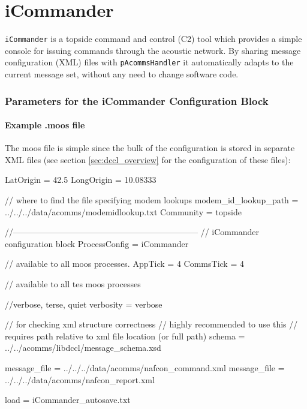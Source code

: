 \documentclass[11pt, letterpaper, oneside]{memoir}
\begin{document}
\section{iCommander}\label{sec:icommander} 

\verb|iCommander| is a topside command and control (C2) tool which provides a simple
console for issuing commands through the acoustic network. By sharing
message configuration (XML) files with \verb|pAcommsHandler| it automatically adapts to the current message set,
without any need to change software code.

\subsubsection{Parameters for the iCommander Configuration Block}
\paragraph{Example .moos file}
The moos file is simple since the bulk of the configuration is stored in separate XML files (see section \ref{sec:dccl_overview} for the configuration of these files):

\begin{small}\begin{boxedverbatim}
LatOrigin = 42.5
LongOrigin = 10.08333

// where to find the file specifying modem lookups
modem_id_lookup_path = ../../../data/acomms/modemidlookup.txt
Community = topside

//------------------------------------------------------------------
// iCommander configuration  block 
ProcessConfig = iCommander
{
  // available to all moos processes.
  AppTick    = 4
  CommsTick  = 4
  
  // available to all tes moos processes

  //verbose, terse, quiet
  verbosity = verbose

  // for checking xml structure correctness
  // highly recommended to use this
  // requires path relative to xml file location (or full path)
  schema = ../../acomms/libdccl/message_schema.xsd

  message_file = ../../../data/acomms/nafcon_command.xml
  message_file = ../../../data/acomms/nafcon_report.xml

  load = iCommander_autosave.txt  
}
\end{boxedverbatim}
\resetbvlinenumber
\end{small}
\end{document}
